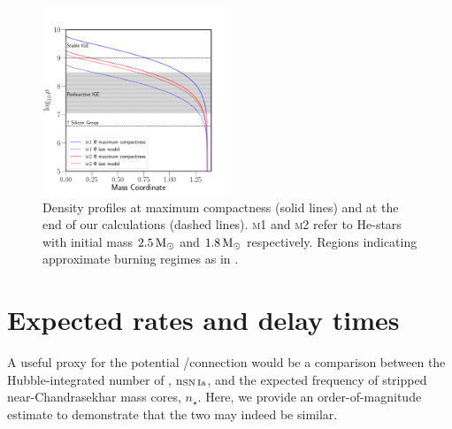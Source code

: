 \documentclass[../../main/thesis_msc.tex]{subfiles}
\begin{document}
\begin{figure}
\begin{center}
\includegraphics[width=0.5\textwidth]{../figures/chapter3/composition.pdf}
\caption{Density profiles at maximum compactness (solid lines) and at the end of our \mesa calculations (dashed lines). \textsc{m1} and \textsc{m2} refer to He-stars with initial mass $\rm 2.5\, M_{\odot}$ and $\rm 1.8\, M_{\odot}$ respectively. Regions indicating approximate burning regimes as in \cite{Seitenzahl2017}.}
\label{fig:nuc}
\end{center}
\end{figure}


\section{Expected rates and delay times}\label{sec:4}
A useful proxy for the potential \one/\ia connection would be a comparison between 
the  Hubble-integrated number of \ias, n$_{\rm SN\,Ia}$, and the expected frequency  of stripped  near-Chandrasekhar mass \one cores, $n_\star$. Here, we provide an
order-of-magnitude estimate to demonstrate that the two may indeed be similar. 
\end{document}

